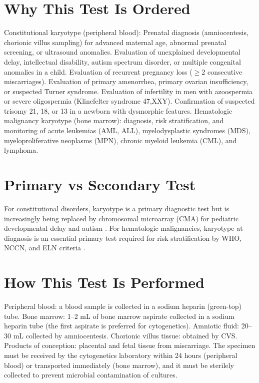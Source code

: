\section*{Why This Test Is Ordered}
Constitutional karyotype (peripheral blood): Prenatal diagnosis (amniocentesis, chorionic villus sampling) for advanced maternal age, abnormal prenatal screening, or ultrasound anomalies. Evaluation of unexplained developmental delay, intellectual disability, autism spectrum disorder, or multiple congenital anomalies in a child. Evaluation of recurrent pregnancy loss ($\geq$2 consecutive miscarriages). Evaluation of primary amenorrhea, primary ovarian insufficiency, or suspected Turner syndrome. Evaluation of infertility in men with azoospermia or severe oligospermia (Klinefelter syndrome 47,XXY). Confirmation of suspected trisomy 21, 18, or 13 in a newborn with dysmorphic features. Hematologic malignancy karyotype (bone marrow): diagnosis, risk stratification, and monitoring of acute leukemias (AML, ALL), myelodysplastic syndromes (MDS), myeloproliferative neoplasms (MPN), chronic myeloid leukemia (CML), and lymphoma.

\section*{Primary vs Secondary Test}
For constitutional disorders, karyotype is a primary diagnostic test but is increasingly being replaced by chromosomal microarray (CMA) for pediatric developmental delay and autism \cite{miller2010consensus}. For hematologic malignancies, karyotype at diagnosis is an essential primary test required for risk stratification by WHO, NCCN, and ELN criteria \cite{dohner2017diagnosis, swerdlow2017who}.

\section*{How This Test Is Performed}
Peripheral blood: a blood sample is collected in a sodium heparin (green-top) tube. Bone marrow: 1--2 mL of bone marrow aspirate collected in a sodium heparin tube (the first aspirate is preferred for cytogenetics). Amniotic fluid: 20--30 mL collected by amniocentesis. Chorionic villus tissue: obtained by CVS. Products of conception: placental and fetal tissue from miscarriage. The specimen must be received by the cytogenetics laboratory within 24 hours (peripheral blood) or transported immediately (bone marrow), and it must be sterilely collected to prevent microbial contamination of cultures.

